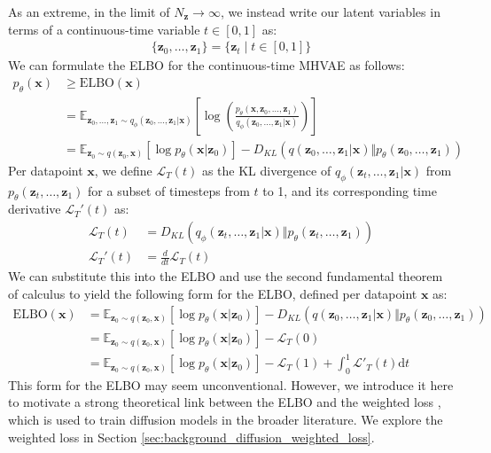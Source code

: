 \documentclass[ oneside,%
                    author={George Herbert},
                    degree={MSci},
                     title={Video Diffusion Models for Climate Simulations},
                  subtitle={}]{dissertation}
\begin{document}
As an extreme, in the limit of $N_\mathbf{z}\to\infty$, we instead write our latent variables in terms of a continuous-time variable $t\in[0,1]$ as:
\begin{align}
      \{\mathbf{z}_0,\ldots,\mathbf{z}_1\}=\{\mathbf{z}_t\mid t\in[0,1]\}
\end{align}
We can formulate the ELBO for the continuous-time MHVAE as follows:
\begin{align}
      p_\theta(\mathbf{x})&\ge \mathrm{ELBO}(\mathbf{x})\\
      &=\mathbb{E}_{\mathbf{z}_0,...,\mathbf{z}_1\sim q_\phi(\mathbf{z}_0,...,\mathbf{z}_1|\mathbf{x})}\left[\log\left(\frac{p_\theta(\mathbf{x},\mathbf{z}_0,\ldots,\mathbf{z}_1)}{q_\phi(\mathbf{z}_0,\ldots,\mathbf{z}_1|\mathbf{x})}\right) \right]\\
      &=\mathbb{E}_{\mathbf{z}_0\sim q(\mathbf{z}_0,\mathbf{x})}\left[\log p_\theta(\mathbf{x}|\mathbf{z}_0)\right]-D_{KL}(q(\mathbf{z}_0,\ldots,\mathbf{z}_1|\mathbf{x})\Vert p_\theta (\mathbf{z}_0,\ldots,\mathbf{z}_1))
\end{align}
Per datapoint $\mathbf{x}$, we define $\mathcal{L}_T(t)$ as the KL divergence of $q_\phi(\mathbf{z}_t,\ldots,\mathbf{z}_1|\mathbf{x})$ from $p_\theta(\mathbf{z}_t,\ldots,\mathbf{z}_1)$ for a subset of timesteps from $t$ to 1, and its corresponding time derivative $\mathcal{L}_T'(t)$ as:
\begin{align}
      \mathcal{L}_T(t)&=D_{KL}(q_\phi(\mathbf{z}_t,\ldots,\mathbf{z}_1|\mathbf{x})\Vert p_\theta(\mathbf{z}_t,\ldots,\mathbf{z}_1))\label{eq:dkl_t}\\
      \mathcal{L}_T'(t)&=\frac{d}{dt}\mathcal{L}_T(t)
\end{align}
We can substitute this into the ELBO and use the second fundamental theorem of calculus to yield the following form for the ELBO, defined per datapoint $\mathbf{x}$ as:
\begin{align}
      \mathrm{ELBO}(\mathbf{x})&=\mathbb{E}_{\mathbf{z}_0\sim q(\mathbf{z}_0,\mathbf{x})}\left[\log p_\theta(\mathbf{x}|\mathbf{z}_0)\right]-D_{KL}(q(\mathbf{z}_0,\ldots,\mathbf{z}_1|\mathbf{x})\Vert p_\theta (\mathbf{z}_0,\ldots,\mathbf{z}_1))\\
      &=\mathbb{E}_{\mathbf{z}_0\sim q(\mathbf{z}_0,\mathbf{x})}\left[\log p_\theta(\mathbf{x}|\mathbf{z}_0)\right]-\mathcal{L}_T(0)\\
      &=\mathbb{E}_{\mathbf{z}_0\sim q(\mathbf{z}_0,\mathbf{x})}\left[\log p_\theta(\mathbf{x}|\mathbf{z}_0)\right]-\mathcal{L}_T(1)+\int_0^1\mathcal{L}'_T(t)\mathrm{d}t \label{eq:elbo_mhvae}
\end{align}
This form for the ELBO may seem unconventional. However, we introduce it here to motivate a strong theoretical link between the ELBO and the weighted loss \cite{Understanding_Diffusion_Objective_Kingma}, which is used to train diffusion models in the broader literature. We explore the weighted loss in Section \ref{sec:background_diffusion_weighted_loss}.
\end{document}
